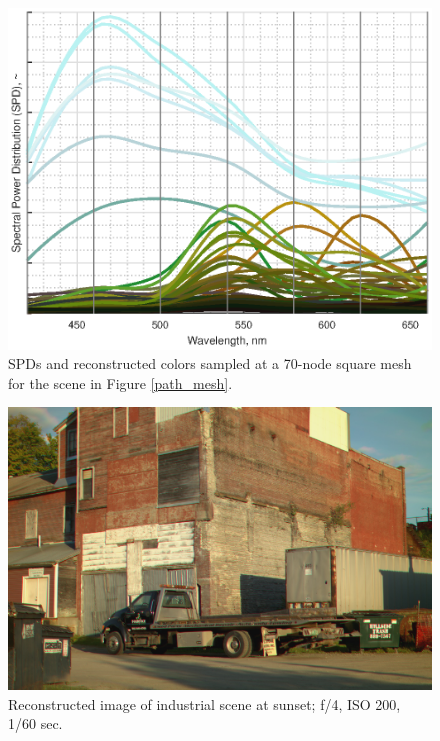 \documentclass[twocolumn,10pt]{asme2ej}
\begin{document}
\begin{figure}[H]
\begin{centering}
  \includegraphics[height=0.6\linewidth]{vermont_path.eps}
  \caption{SPDs and reconstructed colors sampled at a 70-node square mesh for the scene in Figure \ref{path_mesh}.}
  \label{path_SPDs}
  \end{centering}
\end{figure}

\clearpage

\begin{figure}[H]
\begin{centering}
  \includegraphics[height=0.55\linewidth]{truck.jpg}
  \caption{Reconstructed image of industrial scene at sunset; f/4, ISO 200, 1/60 sec.}
  \label{truck_mesh}
  \end{centering}
\end{figure}
\end{document}
